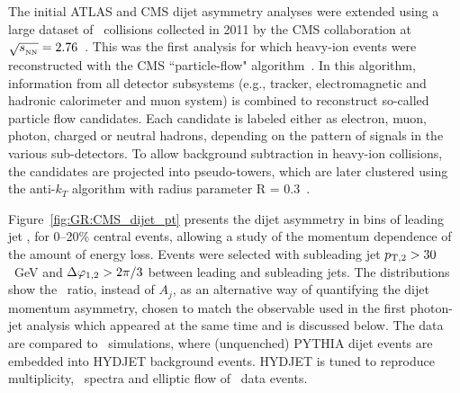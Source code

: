 The initial ATLAS and CMS dijet asymmetry analyses were extended using a 
large dataset of \PbPb\ collisions
collected in 2011 by the CMS collaboration at $\sqrt{s_{_{\rm NN}}}=2.76$\TeV~\cite{CMS_dijet}. 
This was the first analysis for which heavy-ion events were reconstructed
with the  CMS ``particle-flow" 
algorithm~\cite{CMS-PAS-PFT-10-002,MattPFlow}. In this algorithm,
information from all detector subsystems (e.g., tracker, electromagnetic and hadronic
calorimeter and muon system) is combined to reconstruct so-called particle flow candidates.
Each candidate is labeled either as electron, muon, photon, charged or neutral hadrons,
depending on the pattern of signals in the various sub-detectors.
To allow background subtraction in heavy-ion collisions, the candidates are
projected into pseudo-towers, which are later clustered using the anti-$k_T$ algorithm 
with radius parameter R = 0.3~\cite{Cacciari:2008gp}.

Figure~\ref{fig:GR:CMS_dijet_pt} presents the dijet asymmetry in bins of leading jet
\pT, for 0--20\% central events, allowing a study of the momentum dependence of the amount of energy loss.
Events were selected with subleading jet $p_{\rm{T},2}> 30$~GeV and $\Delta\varphi_{1,2}>2\pi/3$ between leading and subleading jets.
The distributions show the \ptrat\ ratio, instead of $A_j$,  as an alternative
way of quantifying the dijet momentum asymmetry, chosen to match the 
observable used in the first photon-jet analysis which appeared at the same time and is discussed
below. The data are compared to \PYTHYD\ simulations, where
(unquenched) PYTHIA dijet events are embedded into HYDJET background events.
HYDJET is tuned to reproduce multiplicity, \pT\ spectra and elliptic flow of \PbPb\ 
data events.

